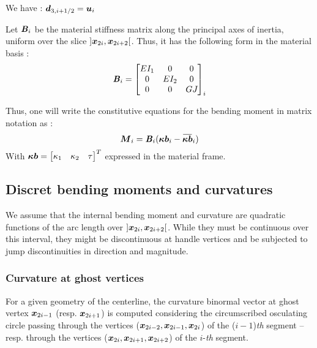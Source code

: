 We have : $\boldsymbol{d}_{3, i+1/2} = \boldsymbol{u}_i$

Let $\boldsymbol{\mathit{B}}_i$ be the material stiffness matrix along the principal axes of inertia, uniform over the slice $]\boldsymbol{x}_{2i},  \boldsymbol{x}_{2i+2}[$. Thus, it has the following form in the material basis :
\begin{equation}
	\boldsymbol{\mathit{B}}_i = \begin{bmatrix}
			EI_1		&	0		&	0		\\
			0		&	EI_{2}	&	0		\\
			0		&	0		&	GJ_{}	\\
		\end{bmatrix}_i
\end{equation}

Thus, one will write the constitutive equations for the bending moment in matrix notation as :
\begin{equation}
	\vect{M}_i =  \mat{B}_{i}(\vect{\kappa b}_{i} - \overbar{\vect{\kappa b}}_{i})
\end{equation}
With $\boldsymbol{\kappa b} = \begin{bmatrix}\kappa_1 & \kappa_2 & \tau \end{bmatrix}^T$ expressed in the material frame.


\subsection{Discret bending moments and curvatures}
We assume that the internal bending moment and curvature are quadratic functions of the arc length over $]\boldsymbol{x}_{2i},  \boldsymbol{x}_{2i+2}[$.
While they must be continuous over this interval, they might be discontinuous at handle vertices and be subjected to jump discontinuities in direction and magnitude.

\clearpage

\def\tabularxcolumn#1{m{#1}} %
\subsubsection{Curvature at ghost vertices}

For a given geometry of the centerline, the curvature binormal vector at ghost vertex  $\boldsymbol{x}_{2i-1}$ (resp. $\boldsymbol{x}_{2i+1}$) is computed considering the circumscribed osculating circle passing through the vertices ($\boldsymbol{x}_{2i-2}, \boldsymbol{x}_{2i-1},  \boldsymbol{x}_{2i}$) of the ($i-1$)\textit{th} segment -- resp. through the vertices ($\boldsymbol{x}_{2i}, \boldsymbol{x}_{2i+1},  \boldsymbol{x}_{2i+2}$) of the $i$-\textit{th} segment.

